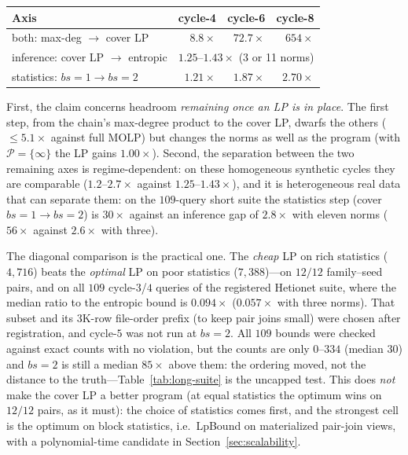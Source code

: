 \documentclass[sigconf, nonacm, acmthm=false]{acmart}
\begin{document}
\begin{center}\small
\begin{tabular}{@{}lrrr@{}}
\toprule
Axis & cycle-4 & cycle-6 & cycle-8 \\
\midrule
both: max-deg $\to$ cover LP & $8.8\times$ & $72.7\times$ & $654\times$ \\
inference: cover LP $\to$ entropic & \multicolumn{3}{c}{$1.25$--$1.43\times$ (3 or 11 norms)} \\
statistics: $bs{=}1 \to bs{=}2$ & $1.21\times$ & $1.87\times$ & $2.70\times$ \\
\bottomrule
\end{tabular}
\end{center}

First, the claim concerns headroom \emph{remaining once an LP is in
place}. The first step, from the chain's max-degree product to the cover LP, dwarfs the others (${\le}5.1\times$ against full MOLP) but changes the norms as well as the program (with $\mathcal{P}=\{\infty\}$ the LP gains $1.00\times$).
Second, the separation between the two remaining axes is
regime-dependent: on these homogeneous synthetic cycles they are
comparable ($1.2$--$2.7\times$ against $1.25$--$1.43\times$), and it is
heterogeneous real data that can separate them: on the $109$-query
short suite the statistics step (cover $bs{=}1\to bs{=}2$) is
$30\times$ against an inference gap of $2.8\times$ with eleven norms ($56\times$ against
$2.6\times$ with three).

The diagonal comparison is the practical one. The \emph{cheap} LP on rich
statistics ($4{,}716$) beats the \emph{optimal} LP on poor statistics
($7{,}388$)---on $12/12$ family--seed pairs, and on all $109$ cycle-$3$/$4$
queries of the registered Hetionet suite, where the median ratio to the
entropic bound is $0.094\times$ ($0.057\times$ with three norms). That subset and its $3$K-row file-order
prefix (to keep pair joins small) were chosen after registration, and
cycle-$5$ was not run at $bs{=}2$. All $109$ bounds were checked against
exact counts with no violation, but the counts are only $0$--$334$
(median $30$) and $bs{=}2$ is still a median $85\times$ above them: the
ordering moved, not the distance to the truth---Table~\ref{tab:long-suite}
is the uncapped test. This does \emph{not} make the cover LP a better program (at equal statistics the optimum wins on $12/12$ pairs, as it must): the choice of statistics comes first, and the strongest cell is the optimum on block statistics, i.e.\ LpBound on materialized pair-join views, with a polynomial-time candidate in Section~\ref{sec:scalability}.
\end{document}
